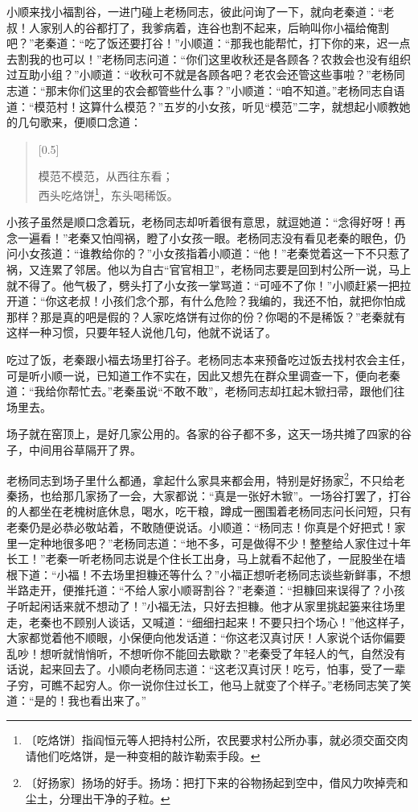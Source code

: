 \documentclass[12pt,UTF-8,openany]{ctexbook}
\begin{document}
\begin{normalsize}
    小顺来找小福割谷，一进门碰上老杨同志，彼此问询了一下，就向老秦道：“老叔！人家别人的谷都打了，我爹病着，连谷也割不起来，后晌叫你小福给俺割吧？”老秦道：“吃了饭还要打谷！”小顺道：“那我也能帮忙，打下你的来，迟一点去割我的也可以！”老杨同志问道：“你们这里收秋还是各顾各？农救会也没有组织过互助小组？”小顺道：“收秋可不就是各顾各吧？老农会还管这些事啦？”老杨同志道：“那末你们这里的农会都管些什么事？”小顺道：“咱不知道。”老杨同志自语道：“模范村！这算什么模范？”五岁的小女孩，听见“模范”二字，就想起小顺教她的几句歌来，便顺口念道：
    
    \begin{verse}[0.5\linewidth]
    
    模范不模范，从西往东看；\\西头吃烙饼\footnote{〔吃烙饼〕指阎恒元等人把持村公所，农民要求村公所办事，就必须交面交肉请他们吃烙饼，是一种变相的敲诈勒索手段。}，东头喝稀饭。
    
    \end{verse}
    
    小孩子虽然是顺口念着玩，老杨同志却听着很有意思，就逗她道：“念得好呀！再念一遍看！”老秦又怕闯祸，瞪了小女孩一眼。老杨同志没有看见老秦的眼色，仍问小女孩道：“谁教给你的？”小女孩指着小顺道：“他！”老秦觉着这一下不只惹了祸，又连累了邻居。他以为自古“官官相卫”，老杨同志要是回到村公所一说，马上就不得了。他气极了，劈头打了小女孩一掌骂道：“可哑不了你！”小顺赶紧一把拉开道：“你这老叔！小孩们念个那，有什么危险？我编的，我还不怕，就把你怕成那样？那是真的吧是假的？人家吃烙饼有过你的份？你喝的不是稀饭？”老秦就有这样一种习惯，只要年轻人说他几句，他就不说话了。
    
    吃过了饭，老秦跟小福去场里打谷子。老杨同志本来预备吃过饭去找村农会主任，可是听小顺一说，已知道工作不实在，因此又想先在群众里调查一下，便向老秦道：“我给你帮忙去。”老秦虽说“不敢不敢”，老杨同志却扛起木锨扫帚，跟他们往场里去。
    
    场子就在窑顶上，是好几家公用的。各家的谷子都不多，这天一场共摊了四家的谷子，中间用谷草隔开了界。
    
    老杨同志到场子里什么都通，拿起什么家具来都会用，特别是好扬家\footnote{〔好扬家〕扬场的好手。扬场：把打下来的谷物扬起到空中，借风力吹掉壳和尘土，分理出干净的子粒。}，不只给老秦扬，也给那几家扬了一会，大家都说：“真是一张好木锨”。一场谷打罢了，打谷的人都坐在老槐树底休息，喝水，吃干粮，蹲成一圈围着老杨同志问长问短，只有老秦仍是必恭必敬站着，不敢随便说话。小顺道：“杨同志！你真是个好把式！家里一定种地很多吧？”老杨同志道：“地不多，可是做得不少！整整给人家住过十年长工！”老秦一听老杨同志说是个住长工出身，马上就看不起他了，一屁股坐在墙根下道：“小福！不去场里担糠还等什么？”小福正想听老杨同志谈些新鲜事，不想半路走开，便推托道：“不给人家小顺哥割谷？”老秦道：“担糠回来误得了？小孩子听起闲话来就不想动了！”小福无法，只好去担糠。他才从家里挑起篓来往场里走，老秦也不顾别人谈话，又喊道：“细细扫起来！不要只扫个场心！”他这样子，大家都觉着他不顺眼，小保便向他发话道：“你这老汉真讨厌！人家说个话你偏要乱吵！想听就悄悄听，不想听你不能回去歇歇？”老秦受了年轻人的气，自然没有话说，起来回去了。小顺向老杨同志道：“这老汉真讨厌！吃亏，怕事，受了一辈子穷，可瞧不起穷人。你一说你住过长工，他马上就变了个样子。”老杨同志笑了笑道：“是的！我也看出来了。”
    

\end{normalsize}
\end{document}
